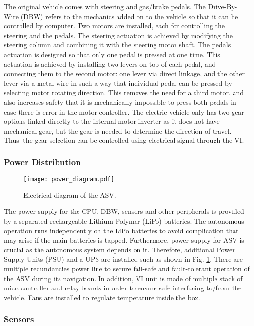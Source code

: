 \documentclass[10 pt,a4paper,conference]{IEEEtran}
\begin{document}
The original vehicle comes with steering and gas/brake pedals. The
Drive-By-Wire (DBW) refers to the mechanics added on to the vehicle so
that it can be controlled by computer. Two motors are installed, each
for controlling the steering and the pedals. The steering actuation is
achieved by modifying the steering column and combining it with the
steering motor shaft. The pedals actuation is designed so that only one
pedal is pressed at one time. This actuation is achieved by installing
two levers on top of each pedal, and connecting them to the second
motor: one lever via direct linkage, and the other lever via a metal
wire in such a way that individual pedal can be pressed by selecting
motor rotating direction. This removes the need for a third motor, and
also increases safety that it is mechanically impossible to press both
pedals in case there is error in the motor controller. The electric
vehicle only has two gear options linked directly to the internal motor
inverter as it does not have mechanical gear, but the gear is needed to
determine the direction of travel. Thus, the gear selection can be
controlled using electrical signal through the VI.

\subsubsection{Power Distribution}\label{power-distribution}

\begin{figure}[!t]
\centering
\texttt{[image: power\_diagram.pdf]}
\caption{Electrical diagram of the ASV.}
\label{fig_power}
\end{figure}

The power supply for the CPU, DBW, sensors and other peripherals is
provided by a separated rechargeable Lithium Polymer (LiPo) batteries.
The autonomous operation runs independently on the LiPo batteries to
avoid complication that may arise if the main batteries is tapped.
Furthermore, power supply for ASV is crucial as the autonomous system
depends on it. Therefore, additional Power Supply Units (PSU) and a UPS
are installed such as shown in Fig. \ref{fig_power}. There are multiple
redundancies power line to secure fail-safe and fault-tolerant operation
of the ASV during its navigation. In addition, VI unit is made of
multiple stack of microcontroller and relay boards in order to ensure
safe interfacing to/from the vehicle. Fans are installed to regulate
temperature inside the box.

\subsubsection{Sensors}\label{sensors}
\end{document}

